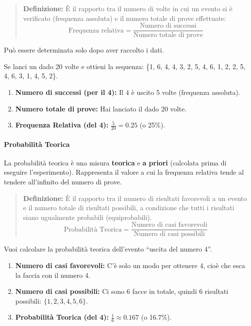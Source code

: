 \begin{quote}
\textbf{Definizione:} È il rapporto tra il numero di volte in cui un evento si è verificato (frequenza assoluta) e il numero totale di prove effettuate:
\[ \text{Frequenza relativa} = \frac{\text{Numero di successi}}{\text{Numero totale di prove}} \]
\end{quote}
Può essere determinata solo dopo aver raccolto i dati.

\begin{esempio}
Se lanci un dado 20 volte e ottieni la sequenza: \{1, 6, 4, 4, 3, 2, 5, 4, 6, 1, 2, 2, 5, 4, 6, 3, 1, 4, 5, 2\}.
\begin{enumerate}
    \item \textbf{Numero di successi (per il 4):} Il 4 è uscito 5 volte (frequenza assoluta).
    \item \textbf{Numero totale di prove:} Hai lanciato il dado 20 volte.
    \item \textbf{Frequenza Relativa (del 4):} $\frac{5}{20} = 0.25$ (o 25\%).
\end{enumerate}
\end{esempio}

\paragraph{Probabilità Teorica}

La probabilità teorica è una misura \textbf{teorica} e \textbf{a priori} (calcolata prima di eseguire l'esperimento). Rappresenta il valore a cui la frequenza relativa tende al tendere all'infinito del numero di prove.

\begin{quote}
\textbf{Definizione:} È il rapporto tra il numero di risultati favorevoli a un evento e il numero totale di risultati possibili, a condizione che tutti i risultati siano ugualmente probabili (equiprobabili).
\[ \text{Probabilità Teorica} = \frac{\text{Numero di casi favorevoli}}{\text{Numero di casi possibili}} \]
\end{quote}

\begin{esempio}
    Vuoi calcolare la probabilità teorica dell'evento ``uscita del numero 4''.
    \begin{enumerate}
        \item \textbf{Numero di casi favorevoli:} C'è solo un modo per ottenere 4, cioè che esca la faccia con il numero 4.
        \item \textbf{Numero di casi possibili:} Ci sono 6 facce in totale, quindi 6 risultati possibili: $\{1, 2, 3, 4, 5, 6\}$.
        \item \textbf{Probabilità Teorica (del 4):} $\frac{1}{6} \approx 0.167$ (o 16.7\%).
    \end{enumerate}
\end{esempio}

